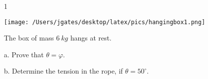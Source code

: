 
\AddToShipoutPicture*{\BackgroundPic}

\addtocounter {ProbNum} {1}

\begin{floatingfigure}[r]{.2\textwidth}
\texttt{[image: /Users/jgates/desktop/latex/pics/hangingbox1.png]}
\end{floatingfigure}
 
{\bf \Large{}} The box of mass ${6~kg}$ hangs at rest. 

\bigskip

\indent  a. Prove that ${\theta = \varphi}$.

\vfill

b. Determine the tension in the rope, if ${\theta = 50^\circ}$.

\vfill

\newpage
